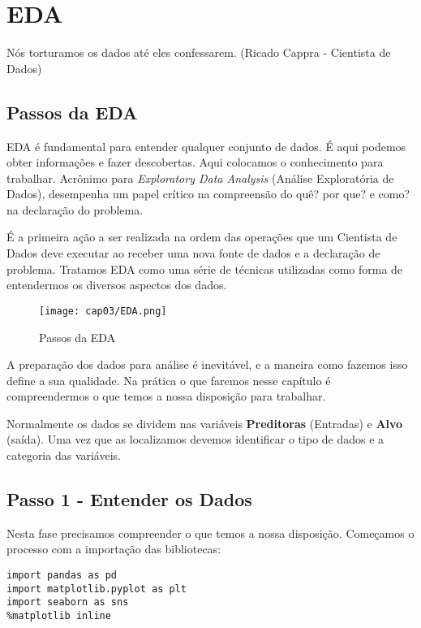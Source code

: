 \chapter{EDA}

\begin{remark}
Nós torturamos os dados até eles confessarem. (Ricado Cappra - Cientista de Dados) 
\end{remark}

\section{Passos da EDA}
EDA é fundamental para entender qualquer conjunto de dados. É aqui podemos obter informações e fazer descobertas. Aqui colocamos o conhecimento para trabalhar. Acrônimo para \textit{Exploratory Data Analysis} (Análise Exploratória de Dados), desempenha um papel crítico na compreensão do quê? por que? e como? na declaração do problema. 

É a primeira ação a ser realizada na ordem das operações que um Cientista de Dados deve executar ao receber uma nova fonte de dados e a declaração de problema. Tratamos EDA como uma série de técnicas utilizadas como forma de entendermos os diversos aspectos dos dados.
\begin{figure}[H]
	\centering
	\texttt{[image: cap03/EDA.png]}
	\caption{Passos da EDA}
\end{figure}

A preparação dos dados para análise é inevitável, e a maneira como fazemos isso define a sua qualidade. Na prática o que faremos nesse capítulo é compreendermos o que temos a nossa disposição para trabalhar.

Normalmente os dados se dividem nas variáveis \textbf{Preditoras} (Entradas) e \textbf{Alvo} (saída). Uma vez que as localizamos devemos identificar o tipo de dados e a categoria das variáveis.

\section{Passo 1 - Entender os Dados}
Nesta fase precisamos compreender o que temos a nossa disposição. Começamos o processo com a importação das bibliotecas:
\begin{lstlisting}
import pandas as pd
import matplotlib.pyplot as plt
import seaborn as sns
%matplotlib inline
\end{lstlisting}

